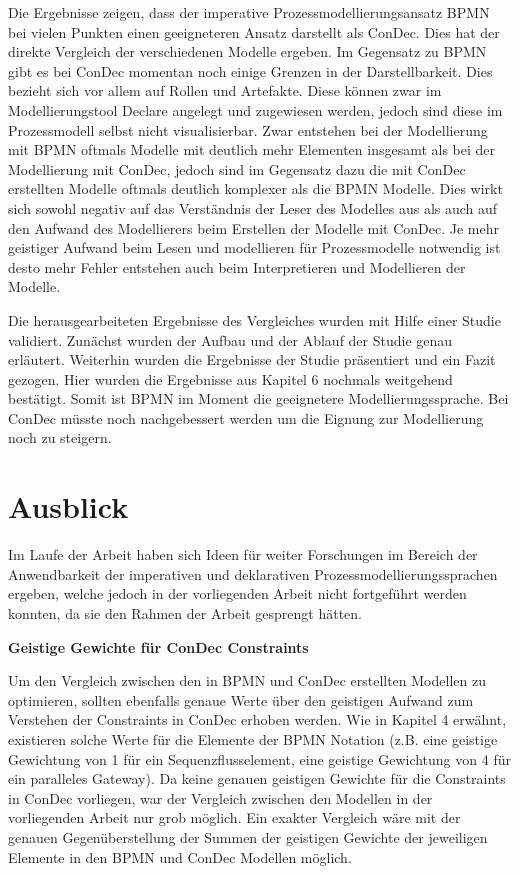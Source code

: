 Die Ergebnisse zeigen, dass der imperative Prozessmodellierungsansatz BPMN bei vielen Punkten einen geeigneteren Ansatz darstellt als ConDec. Dies hat der direkte Vergleich der verschiedenen Modelle ergeben. Im Gegensatz zu BPMN gibt es bei ConDec momentan noch einige Grenzen in der Darstellbarkeit. Dies bezieht sich vor allem auf Rollen und Artefakte. Diese können zwar im Modellierungstool Declare angelegt und zugewiesen werden, jedoch sind diese im Prozessmodell selbst nicht visualisierbar. Zwar entstehen bei der Modellierung mit BPMN oftmals Modelle mit deutlich mehr Elementen insgesamt als bei der Modellierung mit ConDec, jedoch sind im Gegensatz dazu die mit ConDec erstellten Modelle oftmals deutlich komplexer als die BPMN Modelle. Dies wirkt sich sowohl negativ auf das Verständnis der Leser des Modelles aus als auch auf den Aufwand des Modellierers beim Erstellen der Modelle mit ConDec. Je mehr geistiger Aufwand beim Lesen und modellieren für Prozessmodelle notwendig ist desto mehr Fehler entstehen auch beim Interpretieren und Modellieren der Modelle. \newline

Die herausgearbeiteten Ergebnisse des Vergleiches wurden mit Hilfe einer Studie validiert. Zunächst wurden der Aufbau und der Ablauf der Studie genau erläutert. Weiterhin wurden die Ergebnisse der Studie präsentiert und ein Fazit gezogen. Hier wurden die Ergebnisse aus Kapitel 6 nochmals weitgehend bestätigt. Somit ist BPMN im Moment die geeignetere Modellierungssprache. Bei ConDec müsste noch nachgebessert werden um die Eignung zur Modellierung noch zu steigern.\newline


\section{Ausblick}

Im Laufe der Arbeit haben sich Ideen für weiter Forschungen im Bereich der Anwendbarkeit der imperativen und deklarativen Prozessmodellierungssprachen ergeben, welche jedoch in der vorliegenden Arbeit nicht fortgeführt werden konnten, da sie den Rahmen der Arbeit gesprengt hätten.\newline

\textbf{Geistige Gewichte für ConDec Constraints}

Um den Vergleich zwischen den in BPMN und ConDec erstellten Modellen zu optimieren, sollten ebenfalls genaue Werte über den geistigen Aufwand zum Verstehen der Constraints in ConDec erhoben werden. Wie in Kapitel 4 erwähnt, existieren solche Werte für die Elemente der BPMN Notation (z.B. eine geistige Gewichtung von 1 für ein Sequenzflusselement, eine geistige Gewichtung von 4 für ein paralleles Gateway). Da keine genauen geistigen Gewichte für die Constraints in ConDec vorliegen, war der Vergleich zwischen den Modellen in der vorliegenden Arbeit nur grob möglich. Ein exakter Vergleich wäre mit der genauen Gegenüberstellung der Summen der geistigen Gewichte der jeweiligen Elemente in den BPMN und ConDec Modellen möglich.\newline

